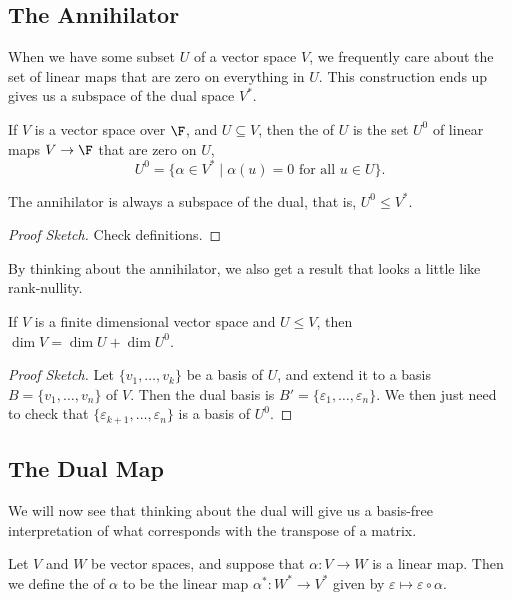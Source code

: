 \subsection{The Annihilator}


When we have some subset $U$ of a vector space $V$, we frequently care about the set of linear maps that are zero on everything in $U$. This construction ends up gives us a subspace of the dual space $V^*$.


\begin{definition}[Annihilator]
    If $V$ is a vector space over $\F$, and $U \subseteq V$, then the  of $U$ is the set $U^0$ of linear maps $V \rightarrow \F$ that are zero on $U$,
    $$
    U^0 = \{ \alpha \in V^* \mid \alpha(u) = 0 \text{ for all }u \in U\}.
    $$
\end{definition}

\begin{lemma}
    The annihilator is always a subspace of the dual, that is, $U^0 \leq V^*$.
\end{lemma}
\begin{proof}[Proof Sketch]    
    Check definitions.
\end{proof}

By thinking about the annihilator, we also get a result that looks a little like rank-nullity.

\begin{lemma}
    If $V$ is a finite dimensional vector space and $U \leq V$, then $\dim V = \dim U + \dim U^0$.
\end{lemma}
\begin{proof}[Proof Sketch]
    Let $\{v_1, \dots, v_k\}$ be a basis of $U$, and extend it to a basis $B = \{v_1, \dots, v_n\}$ of $V$. Then the dual basis is $B' = \{\varepsilon_1, \dots, \varepsilon_n\}$.
    We then just need to check that $\{\varepsilon_{k + 1}, \dots, \varepsilon_n\}$ is a basis of $U^0$.
\end{proof}

\subsection{The Dual Map}

We will now see that thinking about the dual will give us a basis-free interpretation of what corresponds with the transpose of a matrix.

\begin{definition}
    Let $V$ and $W$ be vector spaces, and suppose that $\alpha: V \rightarrow W$ is a linear map. Then we define the  of $\alpha$ to be the linear map $\alpha^*: W^* \rightarrow V^*$ given by $\varepsilon \mapsto \varepsilon \circ \alpha$.
\end{definition}

